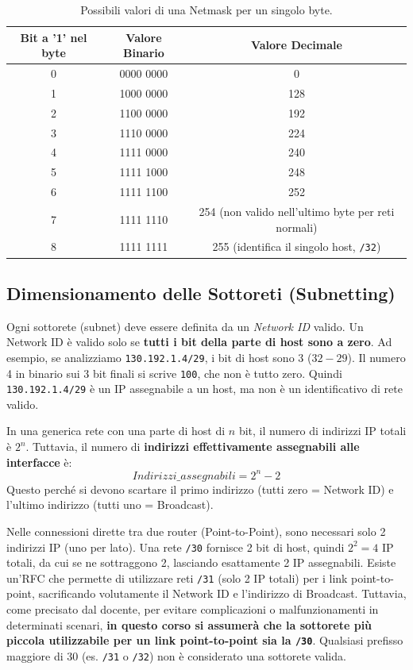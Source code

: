 \begin{table}[H]
    \centering
    \begin{tabular}{c c c}
        \toprule
        \textbf{Bit a '1' nel byte} & \textbf{Valore Binario} & \textbf{Valore Decimale} \\
        \midrule
        0 & 0000 0000 & 0 \\
        1 & 1000 0000 & 128 \\
        2 & 1100 0000 & 192 \\
        3 & 1110 0000 & 224 \\
        4 & 1111 0000 & 240 \\
        5 & 1111 1000 & 248 \\
        6 & 1111 1100 & 252 \\
        7 & 1111 1110 & 254 (non valido nell'ultimo byte per reti normali)\\
        8 & 1111 1111 & 255 (identifica il singolo host, \texttt{/32}) \\
        \bottomrule
    \end{tabular}
    \caption{Possibili valori di una Netmask per un singolo byte.}
    \label{tab:netmask}
\end{table}

\subsection{Dimensionamento delle Sottoreti (Subnetting)}
Ogni sottorete (subnet) deve essere definita da un \textit{Network ID} valido. Un Network ID è valido solo se \textbf{tutti i bit della parte di host sono a zero}. 
Ad esempio, se analizziamo \texttt{130.192.1.4/29}, i bit di host sono 3 ($32-29$). Il numero 4 in binario sui 3 bit finali si scrive \texttt{100}, che non è tutto zero. Quindi \texttt{130.192.1.4/29} è un IP assegnabile a un host, ma non è un identificativo di rete valido.

In una generica rete con una parte di host di $n$ bit, il numero di indirizzi IP totali è $2^n$. Tuttavia, il numero di \textbf{indirizzi effettivamente assegnabili alle interfacce} è:
\[ Indirizzi\_assegnabili = 2^n - 2 \]
Questo perché si devono scartare il primo indirizzo (tutti zero = Network ID) e l'ultimo indirizzo (tutti uno = Broadcast).

\begin{remark}
Nelle connessioni dirette tra due router (Point-to-Point), sono necessari solo 2 indirizzi IP (uno per lato). Una rete \texttt{/30} fornisce 2 bit di host, quindi $2^2 = 4$ IP totali, da cui se ne sottraggono 2, lasciando esattamente 2 IP assegnabili.
Esiste un'RFC che permette di utilizzare reti \texttt{/31} (solo 2 IP totali) per i link point-to-point, sacrificando volutamente il Network ID e l'indirizzo di Broadcast. Tuttavia, come precisato dal docente, per evitare complicazioni o malfunzionamenti in determinati scenari, \textbf{in questo corso si assumerà che la sottorete più piccola utilizzabile per un link point-to-point sia la \texttt{/30}}. Qualsiasi prefisso maggiore di 30 (es. \texttt{/31} o \texttt{/32}) non è considerato una sottorete valida.
\end{remark}

